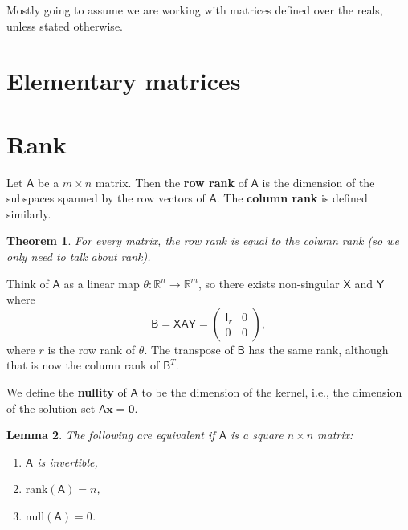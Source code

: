 \documentclass[letter-paper]{tufte-book}
\newtheorem{theorem}{\color{pastel-blue}Theorem}[section]
\newtheorem{lemma}[theorem]{\color{pastel-blue}Lemma}
\newenvironment{proof}[1][Proof]{\begin{trivlist}
\item[\hskip \labelsep {\bfseries #1}]}{\end{trivlist}}
\begin{document}
Mostly going to assume we are working with matrices defined over the reals,
unless stated otherwise.


\section{Elementary matrices}


\section{Rank}

Let $\mathsf{A}$ be a $m\times n$ matrix. Then the \textbf{row rank} of
$\mathsf{A}$ is the dimension of the subspaces spanned by the row vectors of
$\mathsf{A}$. The \textbf{column rank} is defined similarly.

\begin{theorem}
  For every matrix, the row rank is equal to the column rank (so we only need to
  talk about \emph{rank}).
\end{theorem}

\begin{proof}
  Think of $\mathsf{A}$ as a linear map $\theta: \mathbb{R}^n \to \mathbb{R}^m$,
  so there exists non-singular $\mathsf{X}$ and $\mathsf{Y}$ where
  \begin{equation*}
    \mathsf{B} = \mathsf{XAY} = \begin{pmatrix}\mathsf{I}_r & 0 \\ 0 & 0 \end{pmatrix},
  \end{equation*}
  where $r$ is the row rank of $\theta$. The transpose of $\mathsf{B}$ has the
  same rank, although that is now the column rank of $\mathsf{B}^T$.
\end{proof}

We define the \textbf{nullity} of $\mathsf{A}$ to be the dimension of the
kernel, i.e., the dimension of the solution set $\mathsf{A}\boldsymbol{x} =
\boldsymbol{0}$.

\begin{lemma}
  The following are equivalent if $\mathsf{A}$ is a square $n\times n$ matrix:
  \begin{enumerate}
    \item $\mathsf{A}$ is invertible,
    \item $\mbox{rank}(\mathsf{A}) = n$,
    \item $\mbox{null}(\mathsf{A}) = 0$.
  \end{enumerate}
\end{lemma}
\end{document}
